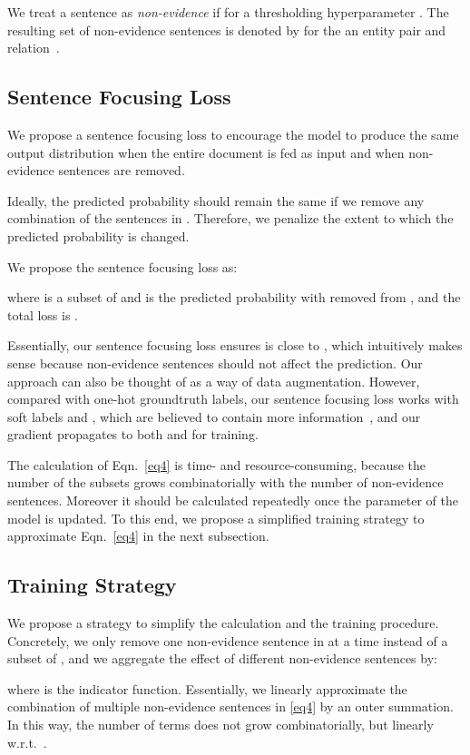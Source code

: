 \documentclass[11pt]{article}
\begin{document}
We treat a sentence  as \textit{non-evidence} if  for a thresholding hyperparameter .
The resulting set of non-evidence sentences is denoted by  for the an entity pair  and relation~.

\subsection{Sentence Focusing Loss}
\label{sec4-2}
We propose a sentence focusing loss to encourage the model to produce the same output distribution when the entire document is fed as input and when non-evidence sentences are removed.

Ideally, the predicted probability should remain the same if we remove any combination of the sentences in . Therefore, we penalize the extent to which the predicted probability is changed.

We propose the sentence focusing loss as:

where  is a subset of  and  is the predicted probability with  removed from , and the total loss is .

Essentially, our sentence focusing loss ensures  is close to , which intuitively makes sense because non-evidence sentences should not affect the prediction. Our approach can also be thought of as a way of data augmentation.
However, compared with one-hot groundtruth labels, our sentence focusing loss works with soft labels  and , which are believed to contain more information~\cite{kd44873}, and our gradient propagates to both  and  for training. 

The calculation of Eqn.~\eqref{eq4} is time- and resource-consuming, because the number of the subsets  grows combinatorially with the number of non-evidence sentences. 
Moreover it should be calculated repeatedly once the parameter of the model is updated.
To this end, we propose a simplified training strategy to approximate Eqn.~\eqref{eq4} in the next subsection.

\subsection{Training Strategy}
\label{sec4-3}
We propose a strategy to simplify the calculation and the training procedure.
Concretely, we only remove one non-evidence sentence in  at a time instead of a subset of , and we aggregate the effect of different non-evidence sentences by:

where  is the indicator function. Essentially, we linearly approximate the combination of multiple non-evidence sentences in \eqref{eq4}  by an outer summation. In this way, the number of terms does not grow combinatorially, but linearly w.r.t.~.
\end{document}
